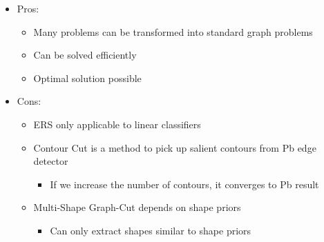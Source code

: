 \documentclass[11pt, a4paper, landscape]{article}
\begin{document}
\NewPage{}
\vfill
\begin{itemize}
	\item Pros:
	\begin{itemize}
		\item Many problems can be transformed into standard graph problems
		\item Can be solved efficiently
		\item Optimal solution possible
	\end{itemize}
	\vfill
	\item Cons:
	\begin{itemize}
		\item ERS only applicable to linear classifiers
		\item Contour Cut is a method to pick up salient contours from Pb edge detector
		\begin{itemize}
			\item If we increase the number of contours, it converges to Pb result
		\end{itemize}
		\item Multi-Shape Graph-Cut depends on shape priors
		\begin{itemize}
			\item Can only extract shapes similar to shape priors
		\end{itemize}
	\end{itemize}
\end{itemize}
\vfill




\FinalPage



\NewPage
\footnotesize


\end{document}
